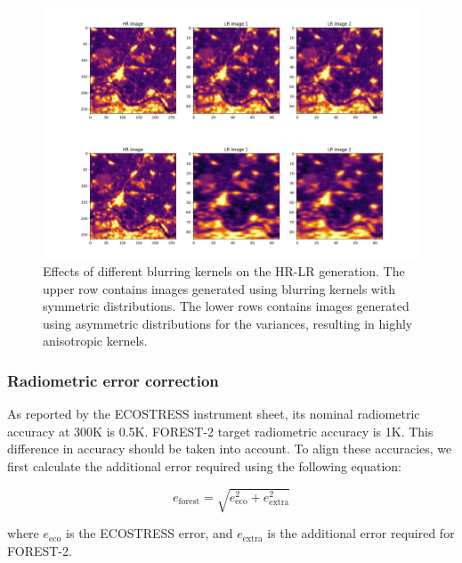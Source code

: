         \begin{figure}[h!]
                \centering
                \includegraphics[width=\linewidth]{Includes/4-degradation-kernel-examples.pdf}
                \caption{Effects of different blurring kernels on the HR-LR generation. The upper row contains images generated using blurring kernels with symmetric distributions. The lower rows contains images generated using asymmetric distributions for the variances, resulting in highly anisotropic kernels.}
                \label{fig:4-degradation_kernels}
            \end{figure}
            
        \subsubsection{Radiometric error correction}

        As reported by the ECOSTRESS instrument sheet,\cite{ECOSTRESS2023INSTRUMENT} its nominal radiometric accuracy at 300K is 0.5K. FOREST-2 target radiometric accuracy is 1K. This difference in accuracy should be taken into account. To align these accuracies, we first calculate the additional error required using the following equation:

        \begin{equation}
            e_{\text{forest}} = \sqrt{e_{\text{eco}}^2 + e_{\text{extra}}^2} 
            \label{eq:4-radiometric-error-correction}
        \end{equation}
        
        where $e_{\text{eco}}$ is the ECOSTRESS error, and $ e_{\text{extra}}$ is the additional error required for FOREST-2.
        
